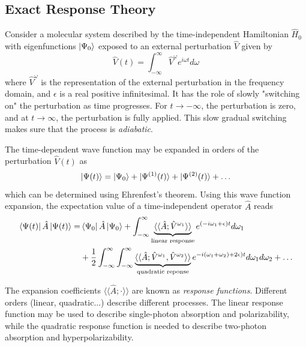 \subsection{Exact Response Theory}

Consider a molecular system described by the time-independent Hamiltonian $\hat{H}_0$ with eigenfunctions $\ket{\Psi_0}$ exposed to
an external perturbation $\hat{V}$ given by \cite{Koc1990}
\begin{equation}
\hat{V}(t) = \int_{-\infty}^{\infty} \hat{V}^{\omega} e^{i\omega t  } d\omega
\end{equation}
\noindent where $\hat{V}^{\omega}$ is the representation of the external perturbation in the frequency domain, and $\epsilon$ is a real positive infinitesimal. It has the role of slowly "switching on" the perturbation as time progresses. For $t\rightarrow -\infty$, the perturbation is zero, and at $t \rightarrow \infty$, the perturbation is fully applied. This slow gradual switching makes sure that the process is \emph{adiabatic}.

The time-dependent wave function may be expanded in orders of the perturbation $\hat{V}(t)$ as
\begin{equation}
\ket{\smash{\Psi (t)}} = \ket{\smash{\Psi_0}} + \ket{\smash{\Psi^{(1)}(t)}} + \ket{\smash{\Psi^{(2)}(t)}} + \ldots
\end{equation}
\noindent which can be determined using Ehrenfest's theorem. Using this wave function expansion, the expectation value of a time-independent operator $\hat{A}$ reads
\begin{equation}
\begin{split}
\bra{\smash{\Psi (t)}} \hat{A} \ket{\smash{\Psi (t)}} = & \bra{\smash{\Psi_0}} \hat{A} \ket{\smash{\Psi_0}} + \int_{-\infty}^{\infty} 
\underbrace{ \langle\langle \hat{A}; \hat{V}^{\omega_1}
\rangle\rangle}_{\text{linear response}} 
e^{(-i\omega_1 + \epsilon)t} d\omega_1 \\
&+ \frac{1}{2} \int_{-\infty}^{\infty} \int_{-\infty}^{\infty}
\underbrace{ \langle\langle \hat{A}; \hat{V}^{\omega_1},\hat{V}^{\omega_2} \rangle\rangle 
}_{\text{quadratic reponse}}
e^{-i(\omega_1+\omega_2) + 2\epsilon)t} d\omega_1 d\omega_2  + \ldots
\end{split}
\label{eq:TIMEEXP}
\end{equation}

\noindent The expansion coefficients $\langle\langle \hat{A}; \cdot \rangle\rangle$ are known as \emph{response functions}. Different orders (linear, quadratic...) describe different processes. The linear response function may be used to describe single-photon absorption and polarizability, while the quadratic response function is needed to describe two-photon absorption and hyperpolarizability. 

